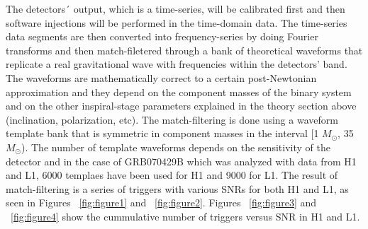 \documentclass[epsf]{article}
\begin{document}
The detectors´ output, which is a time-series, will be calibrated first and then software injections will be performed in the time-domain data. The time-series data segments are then converted into frequency-series by doing Fourier transforms and then match-filetered through a bank of theoretical waveforms that replicate a real gravitational wave with frequencies within the detectors' band. The waveforms are mathematically correct to a certain post-Newtonian approximation and they depend on the component masses of the binary system and on the other inspiral-stage parameters explained in the theory section above (inclination, polarization, etc). The match-filtering is done using a waveform template bank that is symmetric in component masses in the interval [1 $M_{\odot}$, 35 $M_{\odot}$). The number of template waveforms depends on the sensitivity of the detector and in the case of GRB070429B which was analyzed with data from H1 and L1, 6000 templaes have been used for H1 and 9000 for L1. The result of match-filtering is a series of triggers with various SNRs for both H1 and L1, as seen in Figures ~\ref{fig:figure1} and ~\ref{fig:figure2}. Figures ~\ref{fig:figure3} and ~\ref{fig:figure4} show the cummulative number of triggers versus SNR in H1 and L1. 
\end{document}
